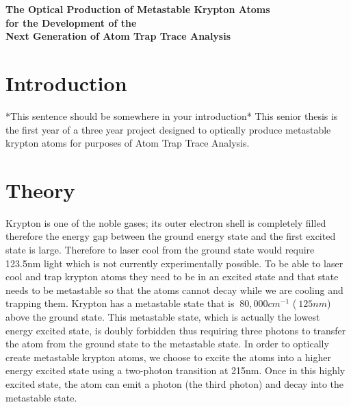 \documentclass[prb,preprint]{revtex4-1}
\begin{document}
\begin{titlepage}
\thispagestyle{empty}
\begin{center}

\fontsize{20pt}{20pt}\text{   }
\vspace{30mm}

{\fontsize{18pt}{18pt}\selectfont \textbf{The Optical Production of Metastable Krypton Atoms \\ for the Development of the \\ Next Generation of Atom Trap Trace Analysis}}


\vfill
{\fontsize{14pt}{14pt}\selectfont {}}

\vfill




\vfill
{\fontsize{14pt}{14pt} \selectfont {}}


\vfill
\fontsize{12pt}{12pt}{\today}
\vfill

\end{center}
\end{titlepage}


\section{Introduction} 
*This sentence should be somewhere in your introduction*  This senior thesis is the first year of a three year project designed to optically produce metastable krypton atoms for purposes of Atom Trap Trace Analysis.

\section{Theory}

Krypton is one of the noble gases; its outer electron shell is completely filled therefore the energy gap between the ground energy state and the first excited state is large. Therefore to laser cool from the ground state would require 123.5nm light which is not currently experimentally possible. To be able to laser cool and trap krypton atoms they need to be in an excited state and that state needs to be metastable so that the atoms cannot decay while we are cooling and trapping them. Krypton has a metastable state that is $~80,000 cm^{-1}$ ($~125 nm$) above the ground state.  This metastable state, which is actually the lowest energy excited state, is doubly forbidden thus requiring three photons to transfer the atom from the ground state to the metastable state.   In order to optically create metastable krypton atoms, we choose to excite the atoms into a higher energy excited state using a two-photon transition at 215nm.  Once in this highly excited state, the atom can emit a photon (the third photon) and decay into the metastable state. 
\end{document}
